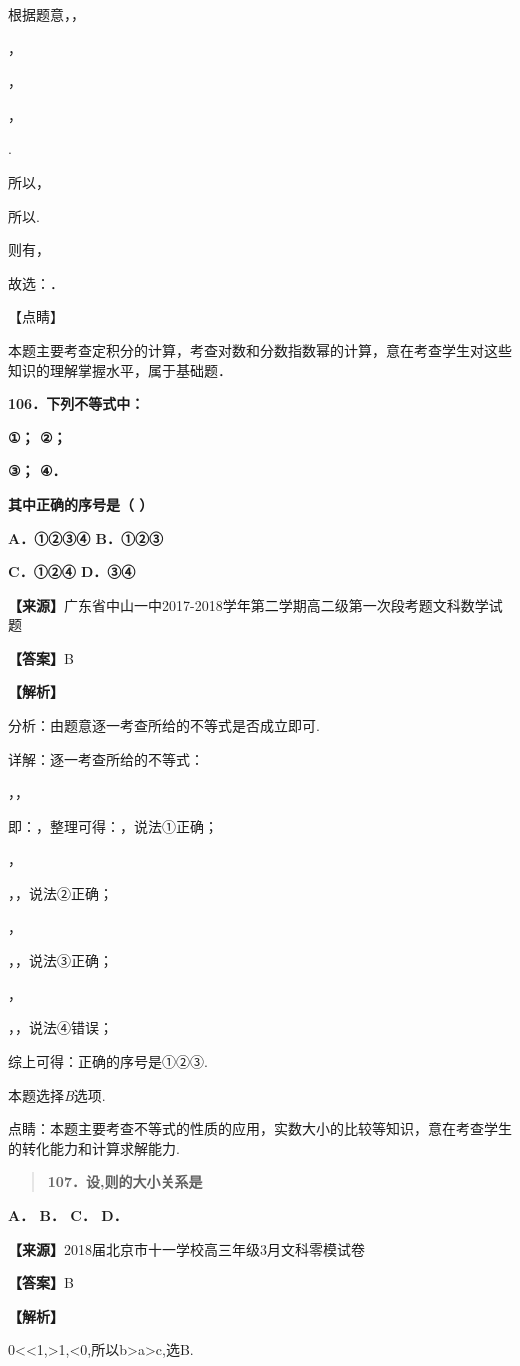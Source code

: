 根据题意，，

，

，

，

.

所以，

所以.

则有，

故选：．

【点睛】

本题主要考查定积分的计算，考查对数和分数指数幂的计算，意在考查学生对这些知识的理解掌握水平，属于基础题．

\textbf{106．下列不等式中：}

\textbf{①； ②；}

\textbf{③； ④．}

\textbf{其中正确的序号是（ ）}

\textbf{A．①②③④ B．①②③}

\textbf{C．①②④ D．③④}

\textbf{【来源】}广东省中山一中2017-2018学年第二学期高二级第一次段考题文科数学试题

\textbf{【答案】}B

\textbf{【解析】}

分析：由题意逐一考查所给的不等式是否成立即可.

详解：逐一考查所给的不等式：

，，

即：，整理可得：，说法①正确；

，

，，说法②正确；

，

，，说法③正确；

，

，，说法④错误；

综上可得：正确的序号是①②③.

本题选择\emph{B}选项.

点睛：本题主要考查不等式的性质的应用，实数大小的比较等知识，意在考查学生的转化能力和计算求解能力.

\begin{quote}
\textbf{107．设,则的大小关系是}
\end{quote}

\textbf{A． B． C． D．}

\textbf{【来源】}2018届北京市十一学校高三年级3月文科零模试卷

\textbf{【答案】}B

\textbf{【解析】}

0\textless\textless1,\textgreater1,\textless0,所以b\textgreater a\textgreater c,选B.

